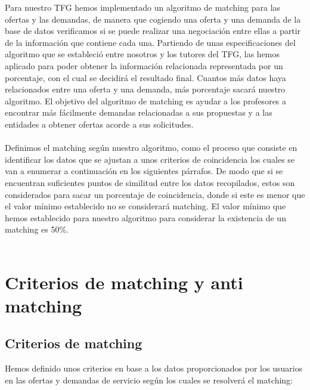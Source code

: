 \documentclass[11pt]{book}
\begin{document}
Para nuestro TFG hemos implementado un algoritmo de matching para las ofertas y las demandas, de manera que cogiendo una oferta y una demanda de la base de datos verificamos si se puede realizar una negociación entre ellas a partir de la información que contiene cada una. Partiendo de unas especificaciones del algoritmo que se estableció entre nosotros y los tutores del TFG, las hemos aplicado para poder obtener la información relacionada representada por un porcentaje, con el cual  se decidirá el resultado final.  Cuantos más datos haya relacionados entre una oferta y una demanda, más porcentaje sacará nuestro algoritmo. El objetivo del algoritmo de matching es ayudar a los profesores a encontrar más fácilmente demandas relacionadas a sus propuestas y a las entidades a obtener ofertas acorde a sus solicitudes. \\\\

Definimos el matching según nuestro algoritmo, como el proceso que consiste en identificar los datos que se ajustan a unos criterios de coincidencia los cuales se van a enumerar a continuación en los siguientes párrafos. De modo que si se encuentran suficientes puntos de similitud entre los datos recopilados, estos son considerados para sacar un porcentaje de coincidencia, donde si este es menor que el valor mínimo establecido no se considerará matching. El valor mínimo que hemos establecido para nuestro algoritmo para considerar la existencia de un matching es 50\%.
\\\\

\section{Criterios de matching y anti matching}
\subsection{Criterios de matching }

Hemos definido unos criterios en base a los datos proporcionados por los usuarios en las ofertas y demandas de servicio según los cuales se resolverá el matching:
\end{document}
